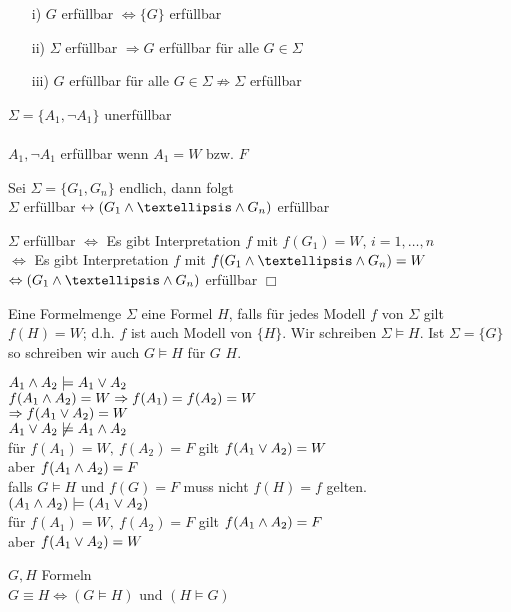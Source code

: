 \beweis{}
\begin{enumerate}
\item[i)] $G$ erfüllbar $\Leftrightarrow \{G\}$ erfüllbar
\item[ii)] $\Sigma$ erfüllbar $\Rightarrow G$ erfüllbar für alle $G \in \Sigma$
\item[iii)] $G$ erfüllbar für alle $G \in \Sigma \not \Rightarrow \Sigma$ erfüllbar
\end{enumerate}
$\Sigma = \{A_1, \neg A_1 \}$ unerfüllbar\\
\noindent\\
$A_1, \neg A_1$ erfüllbar wenn $A_1 = W$ bzw. $F$

Sei $\Sigma = \{G_1, G_n \}$ endlich, dann folgt\\
$\Sigma$ erfüllbar $\leftrightarrow (G_1 \AND … \AND G_n)$ erfüllbar

\beweis{}
$\Sigma$ erfüllbar $\Leftrightarrow$ Es gibt Interpretation $f$ mit $f(G_1) = W$, $i=1, …, n$\\
$\Leftrightarrow$ Es gibt Interpretation $f$ mit $f(G_1 \AND … \AND G_n) = W$\\
$\Leftrightarrow ( G_1 \AND … \AND G_n)$ erfüllbar $\Box$

Eine Formelmenge $\Sigma$  eine Formel $H$, falls für jedes Modell $f$ von $\Sigma$ gilt $f(H) = W$; d.h. $f$ ist auch Modell von $\{H\}$. Wir schreiben $\Sigma \models H$. Ist $\Sigma = \{G\}$ so schreiben wir auch $G \models H $ für $G$  $H$.

\beispiel{}
$A_1 \wedge A_2 \models A_1 \vee A_2$\\
$f(A_1 \wedge A_2) = W \Rightarrow f(A_1) = f(A_2) = W$\\
$\Rightarrow f(A_1 \vee A_2) = W$\\
$A_1 \vee A_2 \not \models A_1 \wedge A_2$\\

\noindent
für $f(A_1) = W,\ f(A_2) = F$ gilt $f(A_1 \vee A_2) = W$\\
aber $f(A_1 \wedge A_2) = F$\\
falls $G \models H$ und $f(G) = F$ muss nicht $f(H) = f$ gelten.\\
$(A_1 \wedge A_2) \models (A_1 \vee A_2)$\\
für $f(A_1) = W,\ f(A_2)=F$ gilt $f(A_1 \wedge A_2) = F$\\
aber $f(A_1 \vee A_2 ) = W$

\bemerkung{}
$G, H$ Formeln\\
$G \equiv H \Leftrightarrow ( G \models H)$ und $(H \models G)$\\

